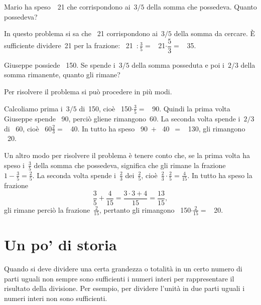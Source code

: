 \begin{exrig}
 \begin{esempio}
Mario ha speso~\officialeuro\ 21 che corrispondono ai~$3/5$ della somma 
che possedeva. Quanto possedeva?

In questo problema si sa che \officialeuro\ 21 corrispondono ai~$3/5$ della 
somma da cercare.
È sufficiente dividere~21 per la frazione:
\officialeuro\ 21~$\displaystyle:\frac{3}{5}=$ \officialeuro\ 
21$\cdot\dfrac{5}{3}=$ \officialeuro\ 35.
 \end{esempio}

 \begin{esempio}
Giuseppe possiede \officialeuro\ 150. Se spende i~$3/5$ della somma 
posseduta e 
poi i~$2/3$ della somma rimanente, quanto gli rimane?

Per risolvere il problema si può procedere in più modi.

Calcoliamo prima i~$3/5$ di~150, cioè \officialeuro\ 150$\cdot\frac{3}{5}=$ 
\officialeuro\ 90.
Quindi la prima volta Giuseppe spende \officialeuro\ 90, perciò gliene 
rimangono~60. La seconda volta spende i~$2/3$ di \officialeuro\ 60, 
cioè \officialeuro\ 60$\frac{2}{3}=$ \officialeuro\ 40. In tutto ha speso
\officialeuro\ 90~$+$ \officialeuro\ 40~$=$ \officialeuro\ 130, gli 
rimangono \officialeuro\ 20.

Un altro modo per risolvere il problema è tenere conto che,
se la prima volta ha speso i~$\frac{3}{5}$ della somma che possedeva,
significa che gli rimane la frazione~$1-\frac{3}{5}=\frac{2}{5}$.
La seconda volta spende i~$\frac{2}{3}$ dei~$\frac{2}{5}$, cioè~$\frac{2}{3}
\cdot\frac{2}{5}=\frac{4}{15}$.
In tutto ha speso la frazione
\[\frac{3}{5}+\frac{4}{15}=\frac{3\cdot3+4}{15}=\frac{13}{15},\]
 gli rimane perciò la frazione~$\frac{2}{15}$, pertanto gli rimangono 
 \officialeuro\ 150$\cdot\frac{2}{15}=$ \officialeuro\ 20.
 \end{esempio}
\end{exrig}


\section{Un po' di  storia}

Quando si deve dividere una certa grandezza o totalità in un certo numero di 
parti uguali non sempre sono sufficienti i numeri interi per rappresentare 
il risultato della divisione. Per esempio, per dividere l'unità in due parti 
uguali i numeri interi non sono sufficienti.

